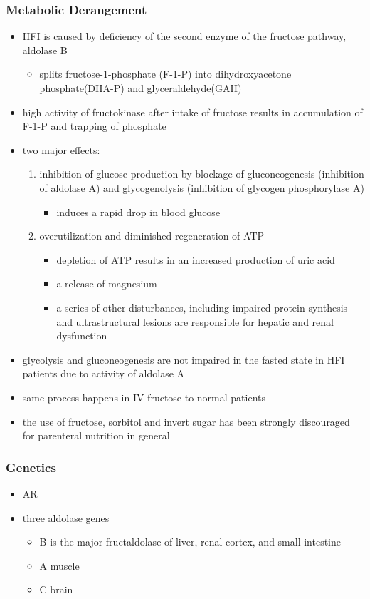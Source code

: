 \documentclass{scrartcl}
\begin{document}
\subsubsection{Metabolic Derangement}
\label{sec:orga82dc67}
\begin{itemize}
\item HFI is caused by deficiency of the second enzyme of the fructose
pathway, aldolase B
\begin{itemize}
\item splits fructose-1-phosphate (F-1-P) into dihydroxyacetone phosphate(DHA-P) and glyceraldehyde(GAH)
\end{itemize}
\item high activity of fructokinase after intake of fructose results in
accumulation of F-1-P and trapping of phosphate
\item two major effects:
\begin{enumerate}
\item inhibition of glucose production by blockage of gluconeogenesis
(inhibition of aldolase A) and glycogenolysis (inhibition of glycogen phosphorylase A)
\begin{itemize}
\item induces a rapid drop in blood glucose
\end{itemize}
\item overutilization and diminished regeneration of ATP
\begin{itemize}
\item depletion of ATP results in an increased production of uric acid
\item a release of magnesium
\item a series of other disturbances, including impaired protein
synthesis and ultrastructural lesions are responsible for
hepatic and renal dysfunction
\end{itemize}
\end{enumerate}
\item glycolysis and gluconeogenesis are not impaired in the fasted state in HFI patients due to activity of aldolase A
\item same process happens in IV fructose to normal patients
\item the use of fructose, sorbitol and invert sugar has been strongly discouraged for parenteral nutrition in general
\end{itemize}

\subsubsection{Genetics}
\label{sec:orge5d3f7f}
\begin{itemize}
\item AR
\item three aldolase genes
\begin{itemize}
\item B is the major fructaldolase of liver, renal cortex, and small intestine
\item A muscle
\item C brain
\end{itemize}
\end{itemize}
\end{document}
